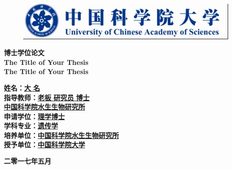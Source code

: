 \begin{titlepage}
\small
{}\uline{\makebox[7em][r]{}}\hfill {}
\uline{\makebox[7em][r]{}}

\uline{\makebox[7em][r]{}}\hfill {}
\uline{\makebox[7em][r]{}}
\normalsize

\vspace{10mm}

\begin{figure}[!h]
\centering
\graphicspath{{figures/}}
\includegraphics[trim=0 1 1 0, clip=true]{logo.jpg}
\end{figure}

\vspace{10mm}

\begin{center}
 \textbf{博士学位论文}\\[10mm]
 \textbf{The Title of Your Thesis}\\
 \textbf{The Title of Your Thesis}\\[10mm]
\end{center}
\large \textbf{姓\qquad 名：}\uline{\hfill\textbf{大}{} {} \textbf{名}\hfill}\\
\large \textbf{指导教师：}\uline{\hfill\textbf{老板}{} {} \textbf{研究员}{} {} \textbf{博士}\hfill}\\
\large \makebox[5em][]{}\uline{\hfill{\textbf{中国科学院水生生物研究所}}\hfill}\\
\large \textbf{申请学位：}\uline{\hfill{\textbf{理学博士}}\hfill}\\
\large \textbf{学科专业：}\uline{\hfill{\textbf{遗传学}}\hfill}\\
\large \textbf{培养单位：}\uline{\hfill{\textbf{中国科学院水生生物研究所}}\hfill}\\
\large \textbf{授予单位：}\uline{\hfill{\textbf{中国科学院大学}}\hfill}\\[4mm]
\begin{center}
\textbf{二零一七年五月}
\end{center}
\end{titlepage}

\vspace*{10mm}
\thispagestyle{empty}
